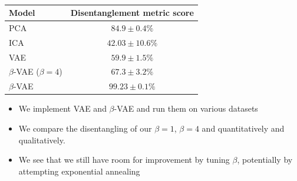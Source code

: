 \documentclass[a0]{a0poster}
\def\Head#1{\begin{center}\noindent{\LARGE\bf\color{Black}#1}\end{center}\bigskip}
\begin{document}
\begin{minipage}[t]{0.32\textwidth}
\begin{minipage}{1.0\columnwidth}
     {\Large {}}\\[1cm]
     \begin{minipage}{\columnwidth}
     	\Large
        \centering
       \begin{tabular}{|>{\centering}m{10cm}|c|}
       	\hline
          \textbf{Model} & \textbf{Disentanglement metric score}\\
          \hline
          PCA \cite{higgins2016beta} & $84.9\pm 0.4\%$\\
          ICA \cite{higgins2016beta} & $42.03\pm 10.6\%$\\
          \hline
          VAE & $59.9 \pm 1.5\%$\\
          $\beta$-VAE ($\beta = 4$) & $67.3 \pm 3.2\%$\\
          $\beta$-VAE \cite{higgins2016beta} & $\mathbf{99.23\pm 0.1\%}$\\
          \hline
      \end{tabular}
      \vspace{1cm}
     \end{minipage}

    \end{minipage}
    \Head{Conclusion}
    \begin{minipage}{0.99\columnwidth}
        \Large
        \begin{itemize}
        \item We implement VAE and $\beta$-VAE and run them on various datasets
        \item We compare the disentangling of  our $\beta = 1$, $\beta = 4$ and \cite{higgins2016beta} quantitatively and qualitatively.
        \item We see that we still have room for improvement by tuning $\beta$, potentially by attempting exponential annealing
        
        \end{itemize}
        \vspace{0cm}
    \large
    
    \nocite{*}
	 
    \end{minipage}
    \vspace{1cm}
\end{minipage}
\hfill
\end{document}
